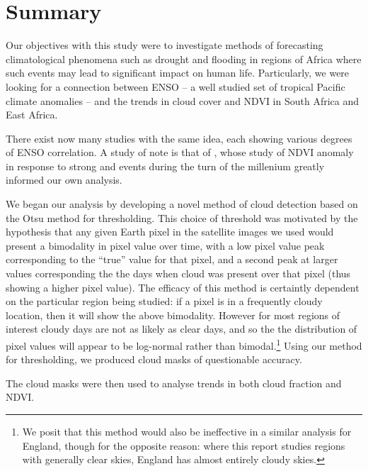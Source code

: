 \section{Summary}

Our objectives with this study were to investigate methods of
forecasting climatological phenomena such as drought and flooding in
regions of Africa where such events may lead to significant impact on
human life. Particularly, we were looking for a connection between
ENSO -- a well studied set of tropical Pacific climate anomalies --
and the trends in cloud cover and NDVI in South Africa and East
Africa.

There exist now many studies with the same idea, each showing various
degrees of ENSO correlation. A study of note is that of
\cite{anyamba2002}, whose study of NDVI anomaly in response to strong
\elnino{} and \nina{} events during the turn of the millenium greatly
informed our own analysis.

We began our analysis by developing a novel method of cloud detection
based on the Otsu method for thresholding. This choice of threshold
was motivated by the hypothesis that any given Earth pixel in the
satellite images we used would present a bimodality in pixel value
over time, with a low pixel value peak corresponding to the ``true''
value for that pixel, and a second peak at larger values corresponding
the the days when cloud was present over that pixel (thus showing a
higher pixel value). The efficacy of this method is certaintly
dependent on the particular region being studied: if a pixel is in a
frequently cloudy location, then it will show the above
bimodality. However for most regions of interest cloudy days are not
as likely as clear days, and so the the distribution of pixel values
will appear to be log-normal rather than bimodal.\footnote{We posit
  that this method would also be ineffective in a similar analysis for
  England, though for the opposite reason: where this report studies
  regions with generally clear skies, England has almost entirely
  cloudy skies.} Using our method for thresholding, we produced cloud
masks of questionable accuracy.

The cloud masks were then used to analyse trends in both cloud
fraction and NDVI.

